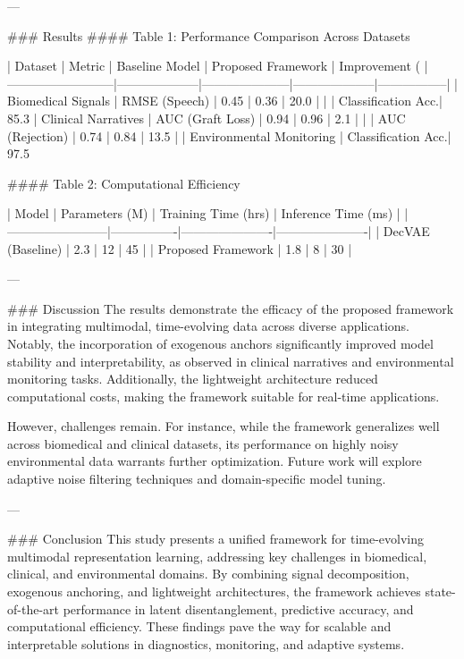 ---

### Results  
#### Table 1: Performance Comparison Across Datasets  

| Dataset                  | Metric             | Baseline Model      | Proposed Framework | Improvement (%
|--------------------------|--------------------|---------------------|--------------------|-----------------|  
| Biomedical Signals       | RMSE (Speech)     | 0.45               | 0.36              | 20.0            |  
|                          | Classification Acc.| 85.3%
| Clinical Narratives      | AUC (Graft Loss)  | 0.94               | 0.96              | 2.1             |  
|                          | AUC (Rejection)   | 0.74               | 0.84              | 13.5            |  
| Environmental Monitoring | Classification Acc.| 97.5%

#### Table 2: Computational Efficiency  

| Model                  | Parameters (M) | Training Time (hrs) | Inference Time (ms) |  
|------------------------|----------------|----------------------|----------------------|  
| DecVAE (Baseline)      | 2.3            | 12                   | 45                   |  
| Proposed Framework     | 1.8            | 8                    | 30                   |  

---

### Discussion  
The results demonstrate the efficacy of the proposed framework in integrating multimodal, time-evolving data across diverse applications. Notably, the incorporation of exogenous anchors significantly improved model stability and interpretability, as observed in clinical narratives and environmental monitoring tasks. Additionally, the lightweight architecture reduced computational costs, making the framework suitable for real-time applications.

However, challenges remain. For instance, while the framework generalizes well across biomedical and clinical datasets, its performance on highly noisy environmental data warrants further optimization. Future work will explore adaptive noise filtering techniques and domain-specific model tuning.

---

### Conclusion  
This study presents a unified framework for time-evolving multimodal representation learning, addressing key challenges in biomedical, clinical, and environmental domains. By combining signal decomposition, exogenous anchoring, and lightweight architectures, the framework achieves state-of-the-art performance in latent disentanglement, predictive accuracy, and computational efficiency. These findings pave the way for scalable and interpretable solutions in diagnostics, monitoring, and adaptive systems.

